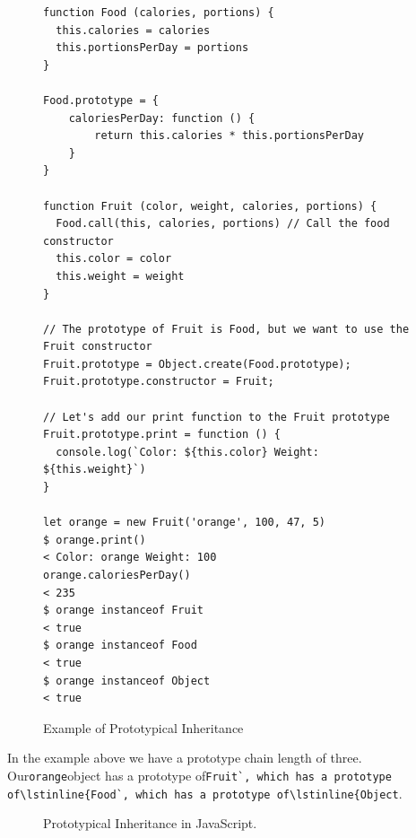 \documentclass[]{final_report}
\begin{document}
\begin{figure}[h]
\begin{verbatim}
function Food (calories, portions) {
  this.calories = calories
  this.portionsPerDay = portions
}

Food.prototype = {
	caloriesPerDay: function () {
		return this.calories * this.portionsPerDay
	}
}

function Fruit (color, weight, calories, portions) {
  Food.call(this, calories, portions) // Call the food constructor
  this.color = color
  this.weight = weight
}

// The prototype of Fruit is Food, but we want to use the Fruit constructor
Fruit.prototype = Object.create(Food.prototype);
Fruit.prototype.constructor = Fruit;

// Let's add our print function to the Fruit prototype
Fruit.prototype.print = function () {
  console.log(`Color: ${this.color} Weight: ${this.weight}`)
}

let orange = new Fruit('orange', 100, 47, 5)
$ orange.print()
< Color: orange Weight: 100
orange.caloriesPerDay()
< 235
$ orange instanceof Fruit
< true
$ orange instanceof Food
< true
$ orange instanceof Object
< true
\end{verbatim}
\caption{\label{fig:js-prototypical-inheritance} Example of Prototypical Inheritance}
\end{figure} 

In the example above we have a prototype chain length of three. Our\lstinline{orange}object has a prototype of\lstinline{Fruit`, which has a prototype of\lstinline{Food`, which has a prototype of\lstinline{Object}.

\begin{figure}[h]
\centering
\fboxsep 2mm
\caption{\label{fig:logo} Prototypical Inheritance in JavaScript.}
\end{figure} 
\end{document}
